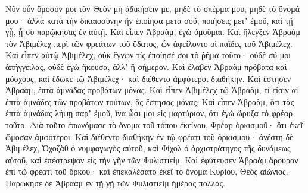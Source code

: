 {Νῦν οὖν ὄμοσόν μοι τὸν Θεὸν μὴ ἀδικήσειν με, μηδὲ τὸ σπέρμα μου, μηδὲ τὸ ὄνομά μου· ἀλλὰ κατὰ τὴν δικαιοσύνην ἣν ἐποίησα μετὰ σοῦ, ποιήσεις μετʼ ἐμοῦ, καὶ τῇ γᾗ, ᾗ σὺ παρῴκησας ἐν αὐτῇ.
Καὶ εἶπεν Ἁβραὰμ, ἐγὼ ὀμοῦμαι.
Καὶ ἤλεγξεν Ἁβραὰμ τὸν Ἀβιμέλεχ περὶ τῶν φρεάτων τοῦ ὕδατος, ὧν ἀφείλοντο οἱ παῖδες τοῦ Ἀβιμέλεχ.
Καὶ εἶπεν αὐτῷ Ἀβιμέλεχ, οὐκ ἔγνων τίς ἐποίησέ σοι τὸ ῥῆμα τοῦτο· οὐδὲ σύ μοι ἀπήγγειλας, οὐδὲ ἐγὼ ἤκουσα, ἀλλʼ ἢ σήμερον.
Καὶ ἔλαβεν Ἁβραὰμ πρόβατα καὶ μόσχους, καὶ ἔδωκε τῷ Ἀβιμέλεχ· καὶ διέθεντο ἀμφότεροι διαθήκην.
Καὶ ἔστησεν Ἁβραὰμ, ἑπτὰ ἀμνάδας προβάτων μόνας.
Καὶ εἶπεν Ἀβιμέλεχ τῷ Ἁβραὰμ, τί εἰσιν αἱ ἑπτὰ ἀμνάδες τῶν προβάτων τούτων, ἃς ἔστησας μόνας;
Καὶ εἶπεν Ἁβραὰμ, ὅτι τὰς ἑπτὰ ἀμνάδας λήψῃ παρʼ ἐμοῦ, ἵνα ὦσι μοι εἰς μαρτύριον, ὅτι ἐγὼ ὤρυξα τό φρέαρ τοῦτο.
Διὰ τοῦτο ἐπωνόμασε τὸ ὄνομα τοῦ τόπου ἐκείνου, Φρέαρ ὁρκισμοῦ· ὅτι ἐκεῖ ὤμοσαν ἀμφότεροι.
Καὶ διέθεντο διαθήκην ἐν τῷ φρέατι τοῦ ὁρκισμου· ἀνέστη δὲ Ἀβιμέλεχ, Ὁχοζὰθ ὁ νυμφαγωγὸς αὐτοῦ, καὶ Φίχολ ὁ ἀρχιστράτηγος τῆς δυνάμεως αὐτοῦ, καὶ ἐπέστρεψαν εἰς τὴν γῆν τῶν Φυλιστιείμ.
Καὶ ἐφύτευσεν Ἁβραὰμ ἄρουραν ἐπὶ τῷ φρέατι τοῦ ὅρκου· καὶ ἐπεκαλέσατο ἐκεῖ τὸ ὄνομα Κυρίου, Θεὸς αἰώνιος.
Παρῴκησε δὲ Ἁβραὰμ ἐν τῇ γῇ τῶν Φυλιστιεὶμ ἡμέρας πολλάς.

}
